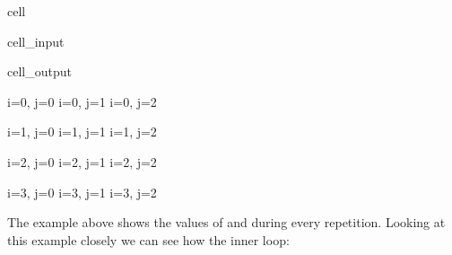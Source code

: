 \documentclass[letterpaper,10pt,english]{jupyterBook}
\begin{document}
\begin{sphinxuseclass}{cell}\begin{sphinxVerbatimInput}

\begin{sphinxuseclass}{cell_input}
\begin{sphinxVerbatim}[commandchars=\\\{\}]
  
   
      
       
                
            
     
        
\end{sphinxVerbatim}

\end{sphinxuseclass}\end{sphinxVerbatimInput}
\begin{sphinxVerbatimOutput}

\begin{sphinxuseclass}{cell_output}
\begin{sphinxVerbatim}[commandchars=\\\{\}]
i=0, j=0
i=0, j=1
i=0, j=2

i=1, j=0
i=1, j=1
i=1, j=2

i=2, j=0
i=2, j=1
i=2, j=2

i=3, j=0
i=3, j=1
i=3, j=2
\end{sphinxVerbatim}

\end{sphinxuseclass}\end{sphinxVerbatimOutput}

\end{sphinxuseclass}
\sphinxAtStartPar
The example above shows the values of  and  during every repetition. Looking at this example closely we can see how the inner loop:

\begin{sphinxVerbatim}[commandchars=\\\{\}]
 
 
 
\end{sphinxVerbatim}
\end{document}

